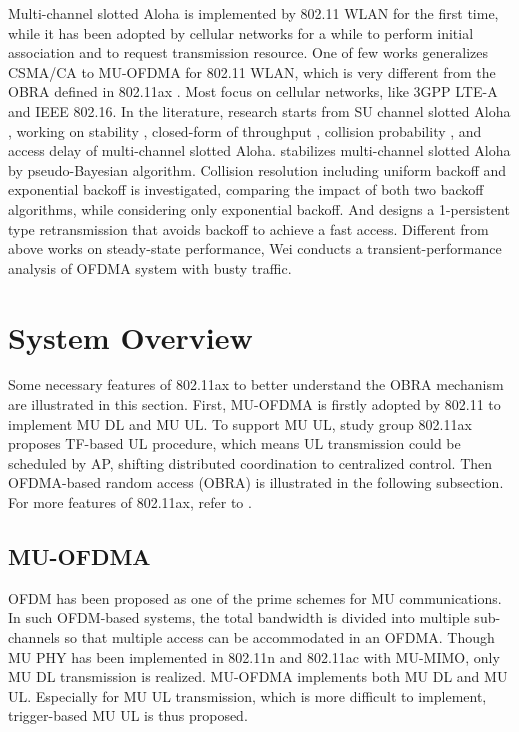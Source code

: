 \documentclass[journal]{IEEEtran}
\begin{document}
Multi-channel slotted Aloha is implemented by 802.11 WLAN for the first time, while it has been adopted by cellular networks for a while to perform initial association and to request transmission resource.
One of few works \cite{GeneralizedOFDMACSMACA} generalizes CSMA/CA to MU-OFDMA for 802.11 WLAN, which is very different from the OBRA defined in 802.11ax \cite{draft_ax}. 
Most focus on cellular networks, like 3GPP LTE-A and IEEE 802.16.
In the literature, research starts from SU channel slotted Aloha \cite{roberts1975aloha}, working on stability \cite{shen2003performance}, closed-form of throughput \cite{zhou2008efficient}\cite{shen2003performance}\cite{choi2006multichannel}, collision probability \cite{kim2012performance}\cite{seo2011design}, and access delay \cite{zhou2008efficient}\cite{kim2012performance}\cite{seo2011design} of multi-channel slotted Aloha.
\cite{shen2003performance} stabilizes multi-channel slotted Aloha by pseudo-Bayesian algorithm.
Collision resolution including uniform backoff and exponential backoff is investigated, \cite{zhou2008efficient}\cite{seo2011design} comparing the impact of both two backoff algorithms, while \cite{kim2012performance} considering only exponential backoff.
And \cite{choi2006multichannel} designs a 1-persistent type retransmission that avoids backoff to achieve a fast access.
Different from above works on steady-state performance, Wei \cite{wei2012modeling}\cite{wei2015modeling} conducts a transient-performance analysis of OFDMA system with busty traffic.


\section{System Overview}			\label{sec_ax_feature}
Some necessary features of 802.11ax to better understand the OBRA mechanism are illustrated in this section.
First, MU-OFDMA is firstly adopted by 802.11 to implement MU DL and MU UL. 
To support MU UL, study group 802.11ax proposes TF-based UL procedure, which means UL transmission could be scheduled by AP, shifting distributed coordination to centralized control.
Then OFDMA-based random access (OBRA) is illustrated in the following subsection.
For more features of 802.11ax, refer to \cite{draft_ax}\cite{dengquality}.

\subsection{MU-OFDMA}
OFDM has been proposed as one of the prime schemes for MU communications.
In such OFDM-based systems, the total bandwidth is divided into multiple sub-channels so that multiple access can be accommodated in an OFDMA.
Though MU PHY has been implemented in 802.11n and 802.11ac with MU-MIMO, only MU DL transmission is realized. 
MU-OFDMA implements both MU DL and MU UL.
Especially for MU UL transmission, which is more difficult to implement, trigger-based MU UL is thus proposed. 
\end{document}
